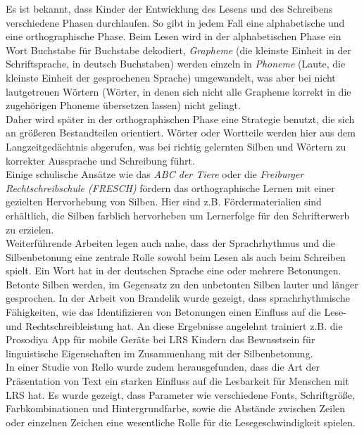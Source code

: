 Es ist bekannt, dass Kinder der Entwicklung des Lesens und des Schreibens verschiedene Phasen durchlaufen\cite{Steinbrink2014}. So gibt in jedem Fall eine alphabetische und eine orthographische Phase. Beim Lesen wird in der alphabetischen Phase ein Wort Buchstabe für Buchstabe dekodiert, \textit{Grapheme} (die kleinste Einheit in der Schriftsprache, in deutsch Buchstaben) werden einzeln in \textit{Phoneme} (Laute, die kleinste Einheit der gesprochenen Sprache) umgewandelt, was aber bei nicht lautgetreuen Wörtern (Wörter, in denen sich nicht alle Grapheme korrekt in die zugehörigen Phoneme übersetzen lassen) nicht gelingt.\\
Daher wird später in der orthographischen Phase eine Strategie benutzt, die sich an größeren Bestandteilen orientiert. Wörter oder Wortteile werden hier aus dem Langzeitgedächtnis abgerufen, was bei richtig gelernten Silben und Wörtern zu korrekter Aussprache und Schreibung führt.\\
Einige schulische Ansätze wie das \textit{ABC der Tiere}\cite{mildenberger2013} oder die \textit{Freiburger Rechtschreibschule (FRESCH)}\cite{Fresch2016} fördern das orthographische Lernen mit einer gezielten Hervorhebung von Silben. Hier sind z.B. Fördermaterialien sind erhältlich, die Silben farblich hervorheben um Lernerfolge für den Schrifterwerb zu erzielen.\\

Weiterführende Arbeiten legen auch nahe, dass der Sprachrhythmus und die Silbenbetonung eine zentrale Rolle sowohl beim Lesen als auch beim Schreiben spielt. Ein Wort hat in der deutschen Sprache eine oder mehrere Betonungen. Betonte Silben werden, im Gegensatz zu den unbetonten Silben lauter und länger gesprochen. In der Arbeit von Brandelik\cite{Brandelik2014} wurde gezeigt, dass sprachrhythmische Fähigkeiten, wie das Identifizieren von Betonungen einen Einfluss auf die Lese- und Rechtschreibleistung hat. An diese Ergebnisse angelehnt trainiert z.B. die Prosodiya App\cite{Holz2017} für mobile Geräte bei LRS Kindern das Bewusstsein für linguistische Eigenschaften im Zusammenhang mit der Silbenbetonung.\\
In einer Studie von Rello\cite{Rello:2017:PMR:3057333.3057414} wurde zudem herausgefunden, dass die Art der Präsentation von Text ein starken Einfluss auf die Lesbarkeit für Menschen mit LRS hat. Es wurde gezeigt, dass Parameter wie verschiedene Fonts, Schriftgröße, Farbkombinationen und Hintergrundfarbe, sowie die Abstände zwischen Zeilen oder einzelnen Zeichen eine wesentliche Rolle für die Lesegeschwindigkeit spielen.

